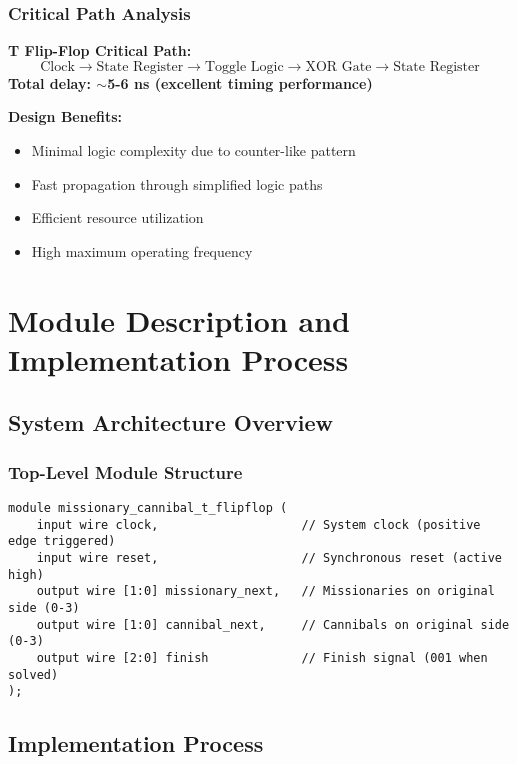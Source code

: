 \documentclass[12pt,letterpaper]{article}
\begin{document}
\subsubsection{Critical Path Analysis}

\textbf{T Flip-Flop Critical Path:}
\begin{equation}
\text{Clock} \rightarrow \text{State Register} \rightarrow \text{Toggle Logic} \rightarrow \text{XOR Gate} \rightarrow \text{State Register}
\end{equation}
\textbf{Total delay: $\sim$5-6 ns (excellent timing performance)}

\textbf{Design Benefits:}
\begin{itemize}
    \item Minimal logic complexity due to counter-like pattern
    \item Fast propagation through simplified logic paths
    \item Efficient resource utilization
    \item High maximum operating frequency
\end{itemize}

\newpage

\section{Module Description and Implementation Process}

\subsection{System Architecture Overview}

\subsubsection{Top-Level Module Structure}
\begin{lstlisting}[caption={Top-Level Module Interface}]
module missionary_cannibal_t_flipflop (
    input wire clock,                    // System clock (positive edge triggered)
    input wire reset,                    // Synchronous reset (active high)
    output wire [1:0] missionary_next,   // Missionaries on original side (0-3)
    output wire [1:0] cannibal_next,     // Cannibals on original side (0-3)  
    output wire [2:0] finish             // Finish signal (001 when solved)
);
\end{lstlisting}

\subsection{Implementation Process}
\end{document}
